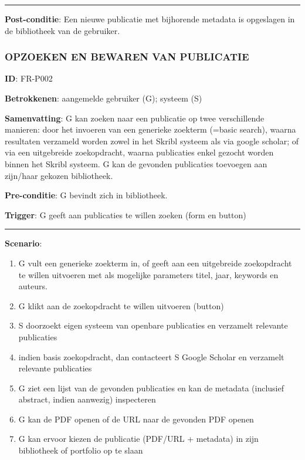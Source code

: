 \vspace{2 mm}
\hrule
\vspace{4 mm}


\noindent \textbf{Post-conditie}: Een nieuwe publicatie met bijhorende metadata is opgeslagen in  de bibliotheek van de gebruiker. \\



\subsubsection{OPZOEKEN EN BEWAREN VAN PUBLICATIE}
\vspace{2 mm}

\textbf{ID}: FR-P002
\vspace{2 mm}

\noindent \textbf{Betrokkenen}: aangemelde gebruiker (G); systeem (S) 
\vspace{2 mm}

\noindent \textbf{Samenvatting}: G kan zoeken naar een publicatie op twee verschillende manieren: door het invoeren van een generieke zoekterm (=basic search), waarna resultaten verzameld worden zowel in het Skribl systeem als via google scholar; of via een uitgebreide zoekopdracht, waarna publicaties enkel gezocht worden binnen het Skribl systeem. G kan de gevonden publicaties toevoegen aan zijn/haar gekozen bibliotheek. 
\vspace{2 mm}

\noindent \textbf{Pre-conditie}: G bevindt zich in bibliotheek. 
\vspace{2 mm}

\noindent \textbf{Trigger}: G geeft aan publicaties te willen zoeken (form en button)
\vspace{4 mm}

\hrule
\vspace{2 mm}
\noindent \textbf{Scenario}:
\begin{enumerate}
\item G vult een generieke zoekterm in, of geeft aan een uitgebreide zoekopdracht te willen uitvoeren met als mogelijke parameters titel, jaar, keywords en auteurs.
\item G klikt aan de zoekopdracht te willen uitvoeren (button)
\item S doorzoekt eigen systeem van openbare publicaties en verzamelt relevante publicaties
\item indien basis zoekopdracht, dan contacteert S Google Scholar en verzamelt relevante publicaties
\item G ziet een lijst van de gevonden publicaties en kan de metadata (inclusief abstract, indien aanwezig) inspecteren
\item G kan de PDF openen of de URL naar de gevonden PDF openen 
\item G kan ervoor kiezen de publicatie (PDF/URL + metadata) in zijn bibliotheek of portfolio op te slaan
\end{enumerate}

